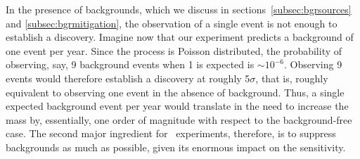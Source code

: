 
In the presence of backgrounds, which we discuss in sections~\ref{subsec:bgrsources} and \ref{subsec:bgrmitigation},  the observation of a single event is not enough to establish a discovery. Imagine now that our  experiment predicts a background of one event per year. Since the process is Poisson distributed, the probability of observing, say, 9 background events when 1 is expected is $\sim 10^{-6}$. Observing 9 events would therefore establish a discovery at roughly 5$\sigma$, that is, roughly equivalent to observing one event in the absence of background. Thus, a single expected background event per year would translate in the need to increase the mass by, essentially, one order of magnitude with respect to the background-free case. The second major ingredient for \bbonu\ experiments, therefore, is to suppress backgrounds as much as possible, given its enormous impact on the sensitivity. 
